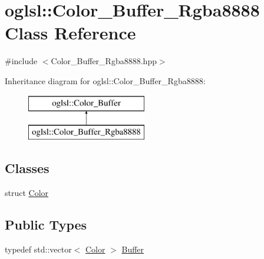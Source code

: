 \hypertarget{classoglsl_1_1_color___buffer___rgba8888}{}\section{oglsl\+:\+:Color\+\_\+\+Buffer\+\_\+\+Rgba8888 Class Reference}
\label{classoglsl_1_1_color___buffer___rgba8888}


{\ttfamily \#include $<$Color\+\_\+\+Buffer\+\_\+\+Rgba8888.\+hpp$>$}

Inheritance diagram for oglsl\+:\+:Color\+\_\+\+Buffer\+\_\+\+Rgba8888\+:\begin{figure}[H]
\begin{center}
\leavevmode
\includegraphics[height=2.000000cm]{classoglsl_1_1_color___buffer___rgba8888}
\end{center}
\end{figure}
\subsection*{Classes}
\begin{DoxyCompactItemize}
\item 
struct \mbox{\hyperlink{structoglsl_1_1_color___buffer___rgba8888_1_1_color}{Color}}
\end{DoxyCompactItemize}
\subsection*{Public Types}
\begin{DoxyCompactItemize}
\item 
typedef std\+::vector$<$ \mbox{\hyperlink{structoglsl_1_1_color___buffer___rgba8888_1_1_color}{Color}} $>$ \mbox{\hyperlink{classoglsl_1_1_color___buffer___rgba8888_a68aacf1d0b3461ed84a7e954ba26936e}{Buffer}}
\end{DoxyCompactItemize}
